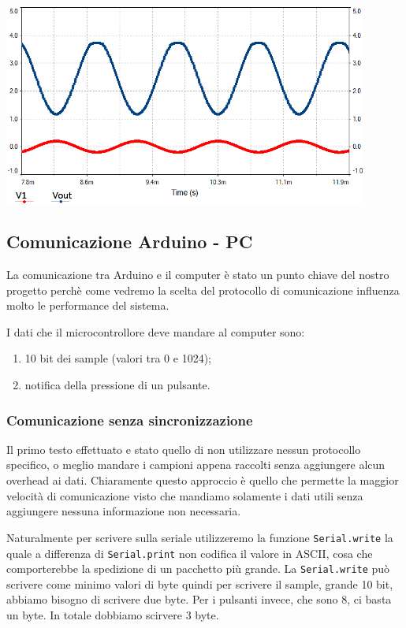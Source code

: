 \documentclass[a4paper,11pt]{article}
\begin{document}
\begin{center}
\includegraphics[width=0.9\textwidth]{screen2.png}
\end{center}



\subsection{Comunicazione Arduino - PC}
La comunicazione tra Arduino e il computer è stato un punto chiave del nostro progetto perchè come vedremo la scelta del protocollo di comunicazione influenza molto le performance del sistema.

I dati che il microcontrollore deve mandare al computer sono:
\begin{enumerate}
    \item 10 bit dei sample (valori tra 0 e 1024);
    \item notifica della pressione di un pulsante.
\end{enumerate}

\subsubsection{Comunicazione senza sincronizzazione}
Il primo testo effettuato e stato quello di non utilizzare nessun protocollo specifico, o meglio mandare i campioni appena raccolti senza aggiungere alcun overhead ai dati. Chiaramente questo approccio è quello che permette la maggior velocità di comunicazione visto che mandiamo solamente i dati utili senza aggiungere nessuna informazione non necessaria.

Naturalmente per scrivere sulla seriale utilizzeremo la funzione \texttt{Serial.write} la quale a differenza di \texttt{Serial.print} non codifica il valore in ASCII, cosa che comporterebbe la spedizione di un pacchetto più grande. La \texttt{Serial.write} può scrivere come minimo valori di byte quindi per scrivere il sample, grande 10 bit, abbiamo bisogno di scrivere due byte. Per i pulsanti invece, che sono 8, ci basta un byte. In totale dobbiamo scirvere 3 byte.
\end{document}
